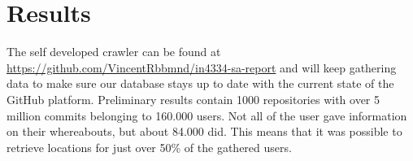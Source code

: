 \documentclass[acmtog, authorversion]{acmart}
\begin{document}
\section{Results}
The self developed crawler can be found at \url{https://github.com/VincentRbbmnd/in4334-sa-report} and will keep gathering data to make sure our database stays up to date with the current state of the GitHub platform.
Preliminary results contain 1000 repositories with over 5 million commits belonging to 160.000 users. 
Not all of the user gave information on their whereabouts, but about 84.000 did.
This means that it was possible to retrieve locations for just over 50\% of the gathered users.



\end{document}
